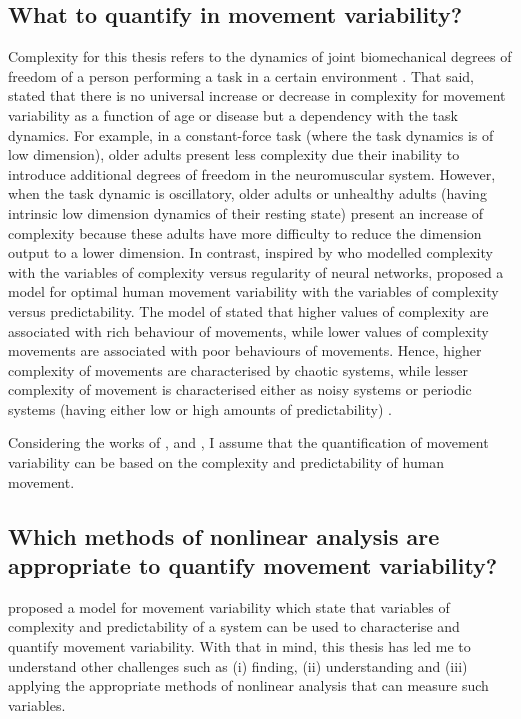 \subsection{What to quantify in movement variability?} \label{what_to_measure_with_MV}
Complexity for this thesis refers to the dynamics of 
joint biomechanical degrees of freedom of a person 
performing a task in a certain environment \citep{davids2003}.
That said, \cite{vaillancourt2002, vaillancourt2003} 
stated that there is no universal 
increase or decrease in complexity for movement variability as a function 
of age or disease 
but a dependency with the task dynamics. For example, in a constant-force 
task (where the task dynamics is of low dimension), older adults 
present less complexity due their inability to introduce additional degrees 
of freedom in the neuromuscular system. 
However, when the task dynamic is oscillatory,
older adults or unhealthy adults 
(having intrinsic low dimension dynamics of their resting state)
present an increase of complexity because these adults have more 
difficulty to reduce the dimension output to a lower dimension. 
In contrast, inspired by \cite{tononi1998} who modelled complexity
with the variables of complexity versus regularity of neural networks,
\cite{stergiou2006} proposed a model for optimal human movement variability
with the variables of complexity versus predictability.
The model of \cite{stergiou2006} stated that higher values of complexity are 
associated with rich behaviour of movements,
while lower values of complexity movements 
are associated with poor behaviours of movements.
Hence, higher complexity of movements are characterised by 
chaotic systems, while lesser complexity of movement is 
characterised either as noisy systems or periodic systems 
(having either low or high amounts of predictability) \citep{stergiou2006}.

Considering the works of \cite{vaillancourt2002, vaillancourt2003}, 
\cite{tononi1998} and \cite{stergiou2006}, 
I assume that the quantification of movement 
variability can be based on the complexity and predictability 
of human movement.

\subsection{Which methods of nonlinear analysis are appropriate to quantify 
movement variability?} 
\label{which_NT_are_appropriate_to_measure_MV}
\cite{stergiou2006} proposed a model for movement variability
which state that variables of complexity and predictability of a system 
can be used to characterise and quantify movement variability.
With that in mind, this thesis has led me to understand 
other challenges such as  
(i) finding, (ii) understanding and (iii) applying the appropriate  
methods of nonlinear analysis that can measure such variables.


